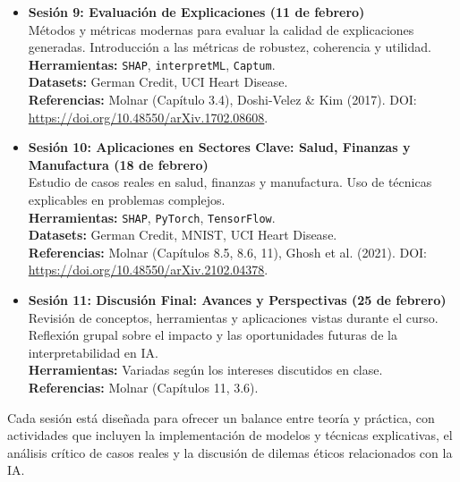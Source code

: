 \begin{itemize}
    \item \textbf{Sesión 9: Evaluación de Explicaciones (11 de febrero)}\\
    Métodos y métricas modernas para evaluar la calidad de explicaciones generadas. Introducción a las métricas de robustez, coherencia y utilidad.\\
    \textbf{Herramientas:} \texttt{SHAP}, \texttt{interpretML}, \texttt{Captum}.\\
    \textbf{Datasets:} German Credit, UCI Heart Disease.\\
    \textbf{Referencias:} Molnar (Capítulo 3.4), Doshi-Velez \& Kim (2017). DOI: \url{https://doi.org/10.48550/arXiv.1702.08608}.

    \item \textbf{Sesión 10: Aplicaciones en Sectores Clave: Salud, Finanzas y Manufactura (18 de febrero)}\\
    Estudio de casos reales en salud, finanzas y manufactura. Uso de técnicas explicables en problemas complejos.\\
    \textbf{Herramientas:} \texttt{SHAP}, \texttt{PyTorch}, \texttt{TensorFlow}.\\
    \textbf{Datasets:} German Credit, MNIST, UCI Heart Disease.\\
    \textbf{Referencias:} Molnar (Capítulos 8.5, 8.6, 11), Ghosh et al. (2021). DOI: \url{https://doi.org/10.48550/arXiv.2102.04378}.

    \item \textbf{Sesión 11: Discusión Final: Avances y Perspectivas (25 de febrero)}\\
    Revisión de conceptos, herramientas y aplicaciones vistas durante el curso. Reflexión grupal sobre el impacto y las oportunidades futuras de la interpretabilidad en IA.\\
    \textbf{Herramientas:} Variadas según los intereses discutidos en clase.\\
    \textbf{Referencias:} Molnar (Capítulos 11, 3.6).
\end{itemize}


Cada sesión está diseñada para ofrecer un balance entre teoría y práctica, con actividades que incluyen la implementación de modelos y técnicas explicativas, el análisis crítico de casos reales y la discusión de dilemas éticos relacionados con la IA.

